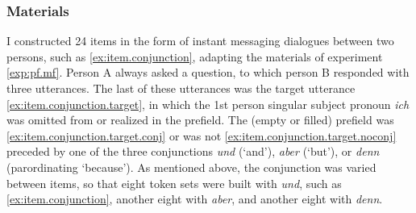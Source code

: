 \subsubsection{Materials}\label{sec:exp.conj.mat}
I constructed 24 items in the form of instant messaging dialogues between two persons, such as \ref{ex:item.conjunction}, adapting the materials of experiment \ref*{exp:pf.mf}.
Person A always asked a question, to which person B responded with three utterances.
The last of these utterances was the target utterance \ref{ex:item.conjunction.target}, in which the 1st person singular subject pronoun \textit{ich} was omitted from or realized in the prefield.
The (empty or filled) prefield was \ref{ex:item.conjunction.target.conj} or was not \ref{ex:item.conjunction.target.noconj} preceded by one of the three conjunctions \textit{und} (`and'), \textit{aber} (`but'), or \textit{denn} (parordinating `because').
As mentioned above, the conjunction was varied between items, so that eight token sets were built with \textit{und}, such as \ref{ex:item.conjunction}, another eight with \textit{aber}, and another eight with \textit{denn}.

